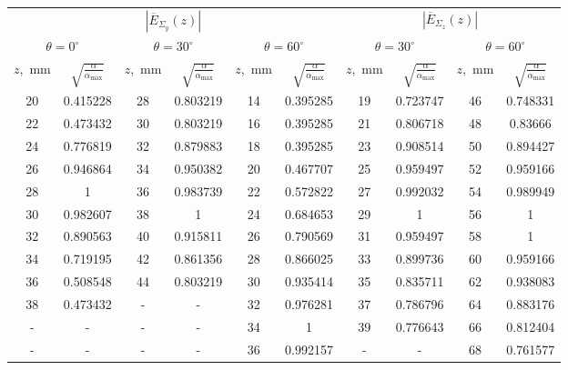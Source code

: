 \documentclass[11pt,a4paper,oneside, titlepage,reqno]{amsproc}
\begin{document}
\begin{centering}
\begin{table}[h!]
\begin{adjustwidth}{-1cm}{}
\vspace{10pt}
\begin{tabular}{cccccccccc}
\toprule %
\multicolumn{6}{c}{$|\overline{E}_{\Sigma_y}(z)|$} &
\multicolumn{4}{c}{$|\overline{E}_{\Sigma_z}(z)|$} \\[5 pt]
\multicolumn{2}{c}{$\theta = 0^\circ$} & 
\multicolumn{2}{c}{$\theta = 30^\circ$} & 
\multicolumn{2}{c}{$\theta = 60^\circ$} &
\multicolumn{2}{c}{$\theta = 30^\circ$} & 
\multicolumn{2}{c}{$\theta = 60^\circ$} \\
$z$,~mm & $\sqrt{\frac{\alpha}{\alpha_{\max}}}$ & 
$z$,~mm & $\sqrt{\frac{\alpha}{\alpha_{\max}}}$ & 
$z$,~mm & $\sqrt{\frac{\alpha}{\alpha_{\max}}}$ & 
$z$,~mm & $\sqrt{\frac{\alpha}{\alpha_{\max}}}$ & 
$z$,~mm & $\sqrt{\frac{\alpha}{\alpha_{\max}}}$ \\
 \midrule
20  &  0.415228  &  28  &  0.803219  &  14  &  0.395285  & 19  &  0.723747  &  46  &  0.748331  \\
22  &  0.473432  &  30  &  0.803219  &  16  &  0.395285  & 21  &  0.806718  &  48  &  0.83666   \\
24  &  0.776819  &  32  &  0.879883  &  18  &  0.395285  & 23  &  0.908514  &  50  &  0.894427  \\
26  &  0.946864  &  34  &  0.950382  &  20  &  0.467707  & 25  &  0.959497  &  52  &  0.959166  \\
28  &  1         &  36  &  0.983739  &  22  &  0.572822  & 27  &  0.992032  &  54  &  0.989949  \\
30  &  0.982607  &  38  &  1         &  24  &  0.684653  & 29  &  1         &  56  &  1         \\
32  &  0.890563  &  40  &  0.915811  &  26  &  0.790569  & 31  &  0.959497  &  58  &  1         \\
34  &  0.719195  &  42  &  0.861356  &  28  &  0.866025  & 33  &  0.899736  &  60  &  0.959166  \\
36  &  0.508548  &  44  &  0.803219  &  30  &  0.935414  & 35  &  0.835711  &  62  &  0.938083  \\
38  &  0.473432  &  -   &  -         &  32  &  0.976281  & 37  &  0.786796  &  64  &  0.883176  \\
-   &  -         &  -   &  -         &  34  &  1         & 39  &  0.776643  &  66  &  0.812404  \\
-   &  -         &  -   &  -         &  36  &  0.992157  & -   &  -         &  68  &  0.761577  \\

\end{tabular}
\end{adjustwidth}
\end{table}
\end{centering}
\end{document}
